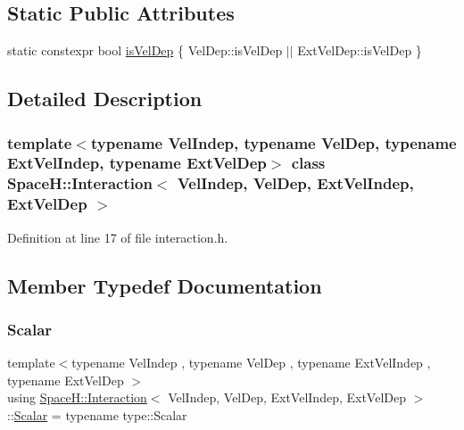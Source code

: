 \subsection*{Static Public Attributes}
\begin{DoxyCompactItemize}
\item 
static constexpr bool \mbox{\hyperlink{class_space_h_1_1_interaction_ac2c52753e6cf7f9040d710345caf7635}{is\+Vel\+Dep}} \{ Vel\+Dep\+::is\+Vel\+Dep $\vert$$\vert$ Ext\+Vel\+Dep\+::is\+Vel\+Dep \}
\end{DoxyCompactItemize}


\subsection{Detailed Description}
\subsubsection*{template$<$typename Vel\+Indep, typename Vel\+Dep, typename Ext\+Vel\+Indep, typename Ext\+Vel\+Dep$>$\newline
class Space\+H\+::\+Interaction$<$ Vel\+Indep, Vel\+Dep, Ext\+Vel\+Indep, Ext\+Vel\+Dep $>$}



Definition at line 17 of file interaction.\+h.



\subsection{Member Typedef Documentation}
\mbox{\label{class_space_h_1_1_interaction_a6ff49274a9233d682fdd75b70ac4d9dc}} 
\subsubsection{\texorpdfstring{Scalar}{Scalar}}
{\footnotesize\ttfamily template$<$typename Vel\+Indep , typename Vel\+Dep , typename Ext\+Vel\+Indep , typename Ext\+Vel\+Dep $>$ \\
using \mbox{\hyperlink{class_space_h_1_1_interaction}{Space\+H\+::\+Interaction}}$<$ Vel\+Indep, Vel\+Dep, Ext\+Vel\+Indep, Ext\+Vel\+Dep $>$\+::\mbox{\hyperlink{class_space_h_1_1_interaction_a6ff49274a9233d682fdd75b70ac4d9dc}{Scalar}} =  typename type\+::\+Scalar}



